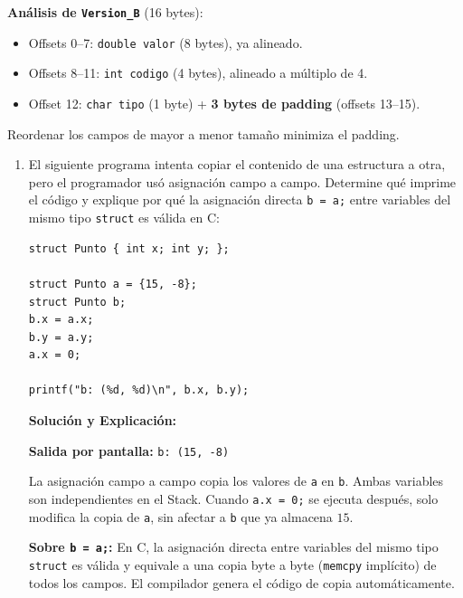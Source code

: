 \documentclass[11pt,letterpaper]{article}
\begin{document}
\begin{enumerate}[label=\textbf{\arabic*.}]
\begin{enumerate}[label=(\alph*)]
\begin{solucionbox}
        \noindent \textbf{Análisis de \texttt{Version\_B}} (16 bytes):
        \begin{itemize}[noitemsep]
            \item Offsets 0--7: \texttt{double valor} (8 bytes), ya alineado.
            \item Offsets 8--11: \texttt{int codigo} (4 bytes), alineado a múltiplo de 4.
            \item Offset 12: \texttt{char tipo} (1 byte) + \textbf{3 bytes de padding} (offsets 13--15).
        \end{itemize}
        Reordenar los campos de mayor a menor tamaño minimiza el padding.
        \end{solucionbox}
    \end{enumerate}

    \newpage
    \begin{enumerate}[label=(\alph*), resume]
        \item El siguiente programa intenta copiar el contenido de una estructura a otra, pero el programador usó asignación campo a campo. Determine qué imprime el código y explique por qué la asignación directa \texttt{b = a;} entre variables del mismo tipo \texttt{struct} es válida en C:
        \begin{lstlisting}[style=customc]
struct Punto { int x; int y; };

struct Punto a = {15, -8};
struct Punto b;
b.x = a.x;
b.y = a.y;
a.x = 0;

printf("b: (%d, %d)\n", b.x, b.y);
        \end{lstlisting}

        \begin{solucionbox}
        \textbf{Solución y Explicación:}

        \noindent \textbf{Salida por pantalla:} \texttt{b: (15, -8)}

        \noindent La asignación campo a campo copia los valores de \texttt{a} en \texttt{b}. Ambas variables son independientes en el Stack. Cuando \texttt{a.x = 0;} se ejecuta después, solo modifica la copia de \texttt{a}, sin afectar a \texttt{b} que ya almacena $15$.

        \noindent \textbf{Sobre \texttt{b = a;}:} En C, la asignación directa entre variables del mismo tipo \texttt{struct} es válida y equivale a una copia byte a byte (\texttt{memcpy} implícito) de todos los campos. El compilador genera el código de copia automáticamente.
        \end{solucionbox}


\end{enumerate}
\end{enumerate}
\end{document}
